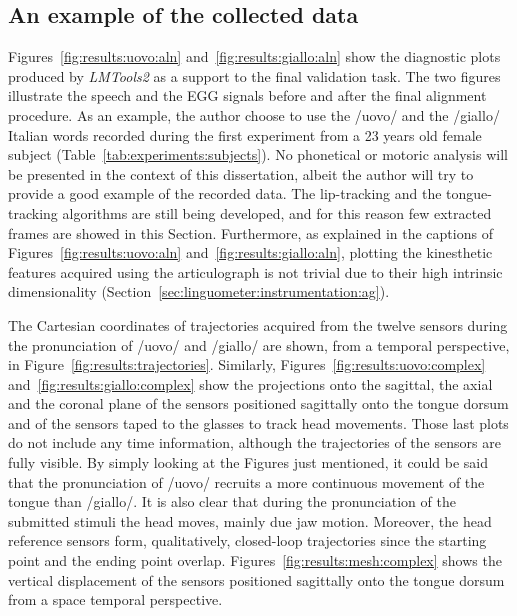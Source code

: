 \subsection{An example of the collected data}
Figures~\ref{fig:results:uovo:aln} and~\ref{fig:results:giallo:aln} show the
diagnostic plots produced by \emph{LMTools2} as a support to the final
validation task.
The two figures illustrate the speech and the EGG signals before and after the
final alignment procedure. As an example, the author choose to use the /uovo/
and the /giallo/ Italian words recorded during the first experiment from a 23
years old female subject (Table~\ref{tab:experiments:subjects}).
No phonetical or motoric analysis will be presented in the context
of this dissertation, albeit the author will try to provide a good example 
of the recorded data.
The lip-tracking and the tongue-tracking algorithms are still being developed,
and for this reason few extracted frames are showed in this Section.
Furthermore, as explained in the captions of Figures~\ref{fig:results:uovo:aln}
and~\ref{fig:results:giallo:aln}, plotting the kinesthetic features acquired
using the articulograph is not trivial due to their high intrinsic 
dimensionality (Section~\ref{sec:linguometer:instrumentation:ag}).




The Cartesian coordinates of trajectories acquired from the twelve sensors 
during the pronunciation of /uovo/ and /giallo/ are shown, from a temporal
perspective, in Figure~\ref{fig:results:trajectories}.
Similarly, Figures~\ref{fig:results:uovo:complex}
and~\ref{fig:results:giallo:complex} show the projections onto the sagittal, 
the axial and the coronal plane of the sensors positioned sagittally onto the 
tongue dorsum and of the sensors taped to the glasses to track head movements.
Those last plots do not include any time information, although the
trajectories of the sensors are fully visible.
By simply looking at the Figures just mentioned, it could be said that the
pronunciation of /uovo/ recruits a more continuous movement of the tongue than
/giallo/. 
It is also clear that during the pronunciation of the submitted stimuli the head
moves, mainly due jaw motion. 
Moreover, the head reference sensors form, qualitatively, closed-loop
trajectories since the starting point and the ending point overlap. 
Figures~\ref{fig:results:mesh:complex} shows the vertical displacement of the
sensors positioned sagittally onto the tongue dorsum from a space temporal 
perspective.

